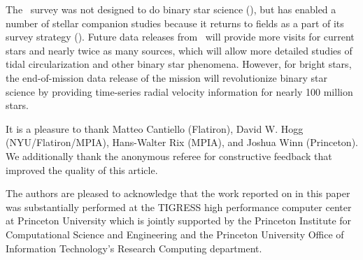 \documentclass[modern, letterpaper]{aastex62}
\newcommand{\apogee}{\project{\acronym{APOGEE}}}
\newcommand{\sdssiv}{\project{\acronym{SDSS-IV}}}
\begin{document}
The \apogee\ survey was not designed to do binary star science
(\citealt{Majewski:2017}), but has enabled a number of stellar companion studies
because it returns to fields as a part of its survey strategy
(\citealt{Troup:2016, Badenes:2018, Price-Whelan:2018}).
Future data releases from \apogee\ will provide more visits for current stars
and nearly twice as many sources, which will allow more detailed studies of
tidal circularization and other binary star phenomena.
However, for bright stars, the end-of-mission data release of the 
mission will revolutionize binary star science by providing time-series radial
velocity information for nearly 100 million stars.

\acknowledgements

It is a pleasure to thank
Matteo Cantiello (Flatiron),
David W. Hogg (NYU/Flatiron/MPIA),
Hans-Walter Rix (MPIA),
and Joshua Winn (Princeton).
We additionally thank the anonymous referee for constructive feedback that improved the quality of this article.

The authors are pleased to acknowledge that the work reported on in this
paper was substantially performed at the TIGRESS high performance computer
center at Princeton University which is jointly supported by the Princeton
Institute for Computational Science and Engineering and the Princeton
University Office of Information Technology's Research Computing department.


\facility{\sdssiv, \apogee}



\end{document}
